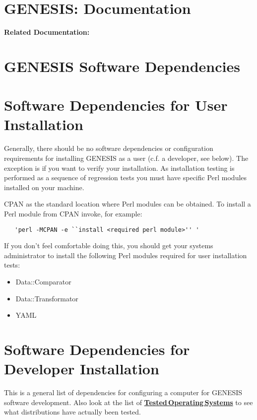\documentclass[12pt]{article}
\begin{document}
\section*{GENESIS: Documentation}

{\bf Related Documentation:}

\section*{GENESIS Software Dependencies}

\section*{Software Dependencies for User Installation}

Generally, there should be no software dependencies or configuration requirements for installing GENESIS as a user (c.f. a developer, see below). The exception is if you want to verify your installation. As installation testing is performed as a sequence of regression tests you must have specific Perl modules installed on your machine.

CPAN as the standard location where Perl modules can be obtained. To install a Perl module from CPAN invoke, for example: 
\begin{verbatim}
   'perl -MCPAN -e ``install <required perl module>'' '
\end{verbatim}

If you don't feel comfortable doing this, you should get your systems administrator to install the following Perl modules required for user installation tests: 

\begin{itemize}
   \item[]Data::Comparator
   \item[]Data::Transformator
   \item[]YAML
\end{itemize}

\section*{Software Dependencies for Developer Installation}

This is a general list of dependencies for configuring a computer for
GENESIS software development.  Also look at the list of \href{../tested-distributions/tested-distributions.tex}{\bf Tested\,Operating\,Systems} to see what distributions have actually
been tested.
\end{document}
